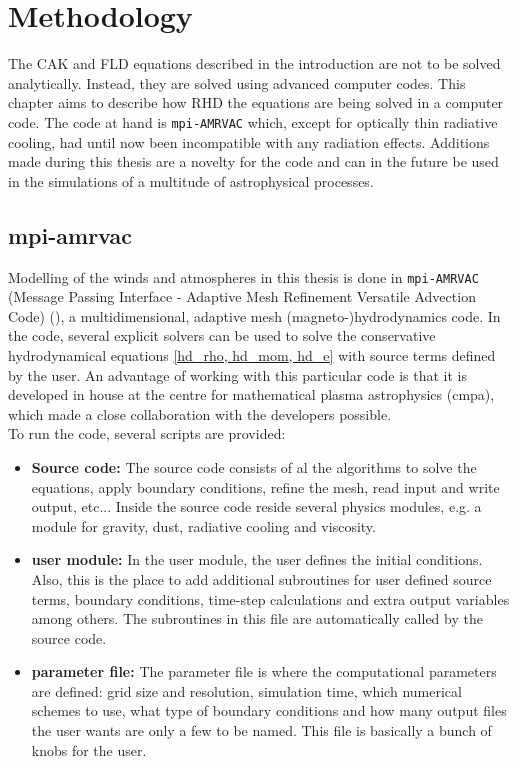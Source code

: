 \chapter{Methodology}
The CAK and FLD equations described in the introduction are not to be solved analytically. Instead, they are solved using advanced computer codes. This chapter aims to describe how RHD the equations are being solved in a computer code. The code at hand is \texttt{mpi-AMRVAC} which, except for optically thin radiative cooling, had until now been incompatible with any radiation effects. Additions made during this thesis are a novelty for the code and can in the future be used in the simulations of a multitude of astrophysical processes.

\section{mpi-amrvac} \label{section: methods amrvac}
Modelling of the winds and atmospheres in this thesis is done in \texttt{mpi-AMRVAC} (Message Passing Interface - Adaptive Mesh Refinement Versatile Advection Code) (\citep{Porth2014}), a multidimensional, adaptive mesh (magneto-)hydrodynamics code. In the code, several explicit solvers can be used to solve the conservative hydrodynamical equations \eqref{hd_rho, hd_mom, hd_e} with source terms defined by the user. An advantage of working with this particular code is that it is developed in house at the centre for mathematical plasma astrophysics (cmpa), which made a close collaboration with the developers possible.\\
To run the code, several scripts are provided:

\begin{itemize}
\item \textbf{Source code:} The source code consists of al the algorithms to solve the equations, apply boundary conditions, refine the mesh, read input and write output, etc... Inside the source code reside several physics modules, e.g. a module for gravity, dust, radiative cooling and viscosity.\\

\item \textbf{user module:} In the user module, the user defines the initial conditions. Also, this is the place to add additional subroutines for user defined source terms, boundary conditions, time-step calculations and extra output variables among others. The subroutines in this file are automatically called by the source code.\\

\item \textbf{parameter file:} The parameter file is where the computational parameters are defined: grid size and resolution, simulation time, which numerical schemes to use, what type of boundary conditions and how many output files the user wants are only a few to be named. This file is basically a bunch of knobs for the user.\\
\end{itemize}

